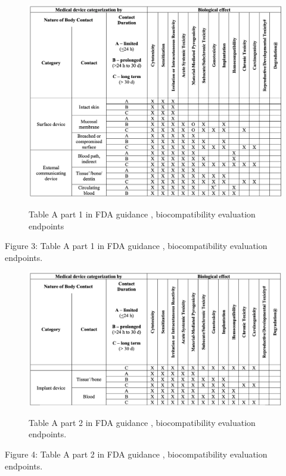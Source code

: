 \documentclass{Configuration_Files/PoliMi3i_thesis}
\begin{document}
\begin{figure}[H]
	\includegraphics[scale=0.3]{tab1_fda.png}
	\centering
    \label{tab_da_1}
    \caption{Table A part 1 in FDA guidance \cite{healthUseInternationalStandard2023}, biocompatibility evaluation endpoints}
\end{figure}

Figure 3: Table A part 1 in FDA guidance \cite{healthUseInternationalStandard2023}, biocompatibility evaluation endpoints.

\begin{figure}[H]

	\includegraphics[scale=0.3]{tab2_fda.png}
	\centering
    \label{tab_da_2}
    \caption{Table A part 2 in FDA guidance \cite{healthUseInternationalStandard2023}, biocompatibility evaluation endpoints.}
\end{figure}

Figure 4: Table A part 2 in FDA guidance \cite{healthUseInternationalStandard2023}, biocompatibility evaluation endpoints.
\end{document}
